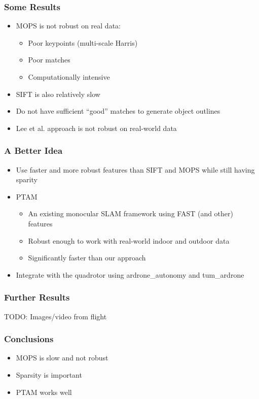 \documentclass[xcolor=x11names,compress,t]{beamer}
\renewcommand{\(}{\begin{columns}}
\renewcommand{\)}{\end{columns}}
\newcommand{\<}[1]{\begin{column}{#1}}
\renewcommand{\>}{\end{column}}
\begin{document}
\begin{frame}
  \frametitle{Some Results}
  \begin{itemize}
  \item MOPS is not robust on real data:
    \begin{itemize}
    \item Poor keypoints (multi-scale Harris)
    \item Poor matches
    \item Computationally intensive
    \end{itemize}
  \item SIFT is also relatively slow
  \item Do not have sufficient ``good'' matches to generate object outlines
  \item Lee et al. approach is not robust on real-world data
  \end{itemize}
\end{frame}

\begin{frame}
  \frametitle{A Better Idea}
  \begin{itemize}
  \item Use faster and more robust features than SIFT and MOPS while still having sparity
  \item PTAM
    \begin{itemize}
    \item An existing monocular SLAM framework using FAST (and other) features
    \item Robust enough to work with real-world indoor and outdoor data
    \item Significantly faster than our approach
    \end{itemize}
  \item Integrate with the quadrotor using ardrone\_autonomy and tum\_ardrone
  \end{itemize}
\end{frame}

\begin{frame}
  \frametitle{Further Results}
  TODO: Images/video from flight
\end{frame}

\begin{frame}
  \frametitle{Conclusions}
  \begin{itemize}
  \item MOPS is slow and not robust
  \item Sparsity is important
  \item PTAM works well
  \end{itemize}
\end{frame}

\end{document}
